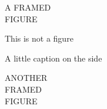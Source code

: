\documentclass{sbabook}
\begin{document}
\begin{figure}[p]
    \begin{framed}
        A FRAMED\\
        FIGURE
    \end{framed}
    \caption{This is not a figure}
\end{figure}

\begin{figure}[p]
    \begin{sidecaption}{A little caption on the side}
        \begin{shaded}
            ANOTHER\\
            FRAMED\\
            FIGURE
        \end{shaded}
    \end{sidecaption}
\end{figure}


\backmatter
\end{document}
